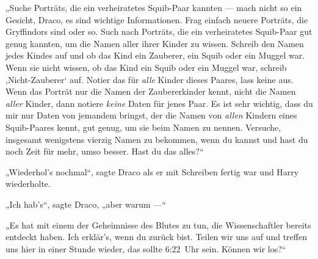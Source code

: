 „Suche Porträts, die ein verheiratetes Squib-Paar kannten — mach nicht so ein Gesicht, Draco, es sind wichtige Informationen. Frag einfach neuere Porträts, die Gryffindors sind oder so. Such nach Porträts, die ein verheiratetes Squib-Paar gut genug kannten, um die Namen aller ihrer Kinder zu wissen. Schreib den Namen jedes Kindes auf und ob das Kind ein Zauberer, ein Squib oder ein Muggel war. Wenn sie nicht wissen, ob das Kind ein Squib oder ein Muggel war, schreib ‚Nicht-Zauberer‘ auf. Notier das für \emph{alle} Kinder dieses Paares, lass keine aus. Wenn das Porträt nur die Namen der Zaubererkinder kennt, nicht die Namen \emph{aller} Kinder, dann notiere \emph{keine} Daten für jenes Paar. Es ist sehr wichtig, dass du mir nur Daten von jemandem bringst, der die Namen von \emph{allen} Kindern eines Squib-Paares kennt, gut genug, um sie beim Namen zu nennen. Versuche, insgesamt wenigstens vierzig Namen zu bekommen, wenn du kannst und hast du noch Zeit für mehr, umso besser. Hast du das alles?“

„Wiederhol’s nochmal“, sagte Draco als er mit Schreiben fertig war und Harry wiederholte.

„Ich hab’s“, sagte Draco, „aber warum —“

„Es hat mit einem der Geheimnisse des Blutes zu tun, die Wissenschaftler bereits entdeckt haben. Ich erklär’s, wenn du zurück bist. Teilen wir uns auf und treffen uns hier in einer Stunde wieder, das sollte 6:22~Uhr sein. Können wir los?“

